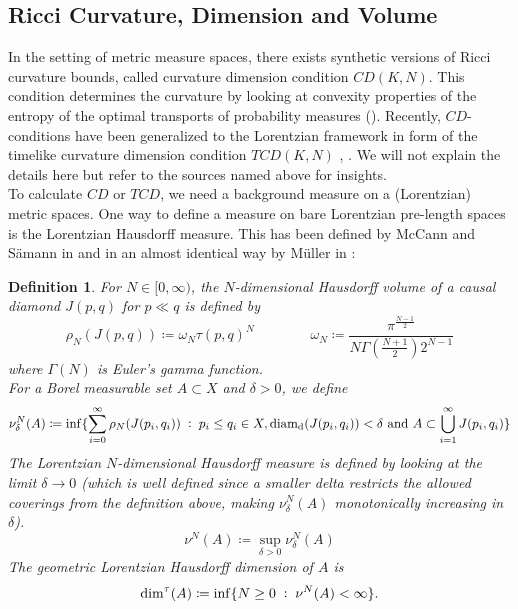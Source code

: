 \documentclass[11pt, a4paper]{article} %
\newcommand{\dd}{\text{d}} %
\newtheorem{definition}{Definition}[section]
\theoremstyle{plain} %
\newcommand{\mDef}{\coloneqq }
\newcommand{\pp}{\; \vcentcolon \;}
\begin{document}
\subsection{Ricci Curvature, Dimension and Volume}
In the setting of metric measure spaces, there exists synthetic versions of Ricci curvature bounds, called curvature dimension condition $CD(K,N)$. This condition determines the curvature by looking at convexity properties of the entropy of the optimal transports of probability measures (\cite{Villani2009}).
Recently, $CD$-conditions have been generalized to the Lorentzian framework in form of the timelike curvature dimension condition $TCD(K,N)$ \cite{Mondino_2022}, \cite{cavalletti2023optimaltransportlorentziansynthetic}. We will not explain the details here but refer to the sources named above for insights.\\
To calculate $CD$ or $TCD$, we need a background measure on a (Lorentzian) metric spaces. One way to define a measure on bare Lorentzian pre-length spaces is the Lorentzian Hausdorff measure. This has been defined by McCann and Sämann in \cite{McCann_2022} and in an almost identical way by Müller in \cite{M_ller_2023}:
\begin{definition}
    For $N\in[0,\infty)$, the $N$-dimensional Hausdorff volume of a causal diamond $J(p,q)$ for $p\ll q$ is defined by 
    \begin{equation*}
        \rho_N (J(p,q)) \mDef \omega_N \tau(p,q)^N \qquad \qquad \omega_N \mDef\frac{\pi^{\frac{N-1}{2}}}{N \Gamma(\frac{N+1}{2}) 2^{N-1}}
    \end{equation*}
    where $\Gamma(N)$ is Euler's gamma function.\\
    For a Borel measurable set $A\subset X$ and $\delta>0$, we define
    \begin{equation*}
        \nu_\delta^N(A)\mDef \inf\{\sum_{i=0}^\infty \rho_N(J(p_i,q_i)) \pp p_i\leq q_i\in X, \text{diam}_\dd(J(p_i,q_i))<\delta \text{ and } A\subset \bigcup_{i=1}^\infty J(p_i,q_i)\}
    \end{equation*}
    The Lorentzian $N$-dimensional Hausdorff measure is defined by looking at the limit $\delta \to 0$ (which is well defined since a smaller delta restricts the allowed coverings from the definition above, making $\nu_\delta^N(A)$ monotonically increasing in $\delta$).
    \begin{equation*}
        \nu^N(A) \mDef \sup_{\delta>0} \nu_\delta^N(A)
    \end{equation*}
    The geometric Lorentzian Hausdorff dimension of $A$ is 
    \begin{equation*}
        \dim^\tau(A)\mDef \inf\{N\geq 0\pp \nu^N(A)<\infty\}.
    \end{equation*}
\end{definition}
\end{document}
